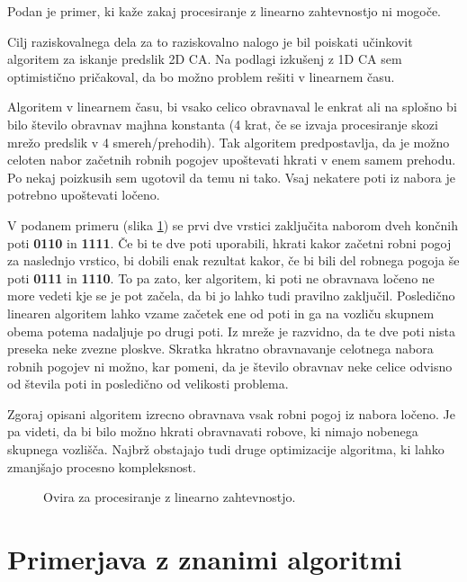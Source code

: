 \documentclass[12pt,a4paper,openany,twoside]{book}
\begin{document}
Podan je primer, ki kaže zakaj procesiranje z linearno zahtevnostjo ni mogoče.

Cilj raziskovalnega dela za to raziskovalno nalogo je bil poiskati
učinkovit algoritem za iskanje predslik 2D CA. Na podlagi izkušenj z 1D CA
sem optimistično pričakoval, da bo možno problem rešiti v linearnem času.

Algoritem v linearnem času, bi vsako celico obravnaval le enkrat
ali na splošno bi bilo število obravnav majhna konstanta (4 krat,
če se izvaja procesiranje skozi mrežo predslik v 4 smereh/prehodih).
Tak algoritem predpostavlja, da je možno celoten nabor začetnih
robnih pogojev upoštevati hkrati v enem samem prehodu. Po nekaj
poizkusih sem ugotovil da temu ni tako. Vsaj nekatere poti iz nabora je
potrebno upoštevati ločeno.

V podanem primeru (slika \ref{algorithm_issue}) se prvi dve vrstici zaključita
naborom dveh končnih poti \textbf{0110} in \textbf{1111}. Če bi te dve poti
uporabili, hkrati kakor začetni robni pogoj za naslednjo vrstico, bi dobili
enak rezultat kakor, če bi bili del robnega pogoja še poti \textbf{0111} in \textbf{1110}.
To pa zato, ker algoritem, ki poti ne obravnava ločeno ne more vedeti
kje se je pot začela, da bi jo lahko tudi pravilno zaključil.
Posledično linearen algoritem lahko vzame začetek ene od poti in ga
na vozliču skupnem obema potema nadaljuje po drugi poti.
Iz mreže je razvidno, da te dve poti nista preseka neke zvezne ploskve.
Skratka hkratno obravnavanje celotnega nabora robnih pogojev ni možno,
kar pomeni, da je število obravnav neke celice odvisno od števila poti
in posledično od velikosti problema.

Zgoraj opisani algoritem izrecno obravnava vsak robni pogoj iz nabora ločeno.
Je pa videti, da bi bilo možno hkrati obravnavati robove, ki nimajo nobenega skupnega
vozlišča. Najbrž obstajajo tudi druge optimizacije algoritma, ki lahko zmanjšajo
procesno kompleksnost.

\begin{figure}[htb]
\centerline{}
\caption[Ovira za procesiranje z linearno zahtevnostjo.]{Ovira za procesiranje z linearno zahtevnostjo.}
\label{algorithm_issue}
\end{figure}

\chapter{Primerjava z znanimi algoritmi}
\end{document}
